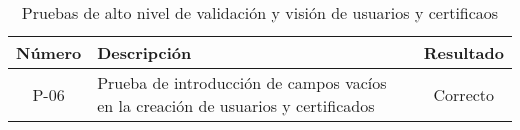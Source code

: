 \begin{table}[!h]
	\begin{center}
		\begin{tabular}{|c|p{6cm}|c|}
				\hline \textbf{Número} & \textbf{Descripción} & \textbf{Resultado}\\ 
				\hline P-06 & Prueba de introducción de campos vacíos en la creación de usuarios y certificados & Correcto \\
				\hline 
		\end{tabular}
		\caption{Pruebas de alto nivel de validación y visión de usuarios y certificaos}
		\label{tab:validateTest}
	\end{center}
\end{table}
